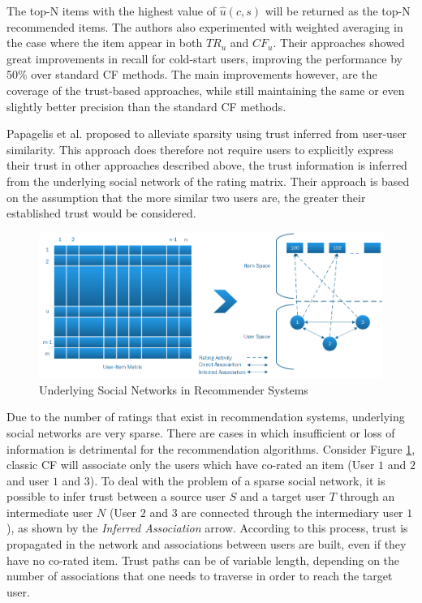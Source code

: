 The top-N items with the highest value of $\hat{u}(c,s)$ will be returned as
the top-N recommended items. The authors also experimented with weighted
averaging in the case where the item appear in both $TR_{u}$ and $CF_{u}$.
Their approaches showed great improvements in recall for cold-start users,
improving the performance by 50\% over standard CF methods. The main
improvements however, are the coverage of the trust-based approaches, while
still maintaining the same or even slightly better precision than the standard
CF methods.

Papagelis et al. \cite{Papagelis2005} proposed to alleviate sparsity using
trust inferred from user-user similarity. This approach does therefore not
require users to explicitly express their trust in other
approaches described above, the trust information is inferred from the
underlying social network of the rating matrix. Their approach is based on the
assumption that the more similar two users are, the greater their established
trust would be considered.

\begin{figure}[H]
    \includegraphics[width=5in]{image/trustnetwork.png}
    \centering
    \caption[Underlying Social Networks in Recommender Systems]{Underlying Social Networks in Recommender Systems}
    \label{figure:cfsocialnetwork}
\end{figure}

Due to the number of ratings that exist in recommendation systems, underlying
social networks are very sparse. There are cases in which insufficient or loss
of information is detrimental for the recommendation algorithms. Consider
Figure \ref{figure:cfsocialnetwork}, classic CF will associate only the users
which have co-rated an item (User $1$ and $2$ and user $1$ and $3$). To deal
with the problem of a sparse social network, it is possible to infer trust
between a source user $S$ and a target user $T$ through an intermediate user
$N$ (User $2$ and $3$ are connected through the intermediary user $1$), as
shown by the \emph{Inferred Association} arrow. According to this process,
trust is propagated in the network and associations between users are built,
even if they have no co-rated item. Trust paths can be of variable length,
depending on the number of associations that one needs to traverse in order to
reach the target user.

